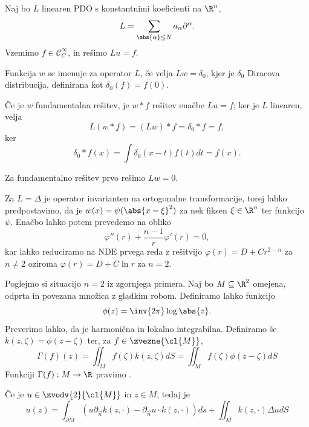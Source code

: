 
Naj bo $L$ linearen PDO s konstantnimi koeficienti na $\R^n$,
\[
  L = \sum_{\abs{\alpha} \le N} a_{\alpha} \partial^\alpha.
\]
Vzemimo $f \in \mathcal{C}^\infty_C$, in rešimo $L u = f$.

\begin{definicija}
  Funkcija $w$ se imenuje  za operator $L$, če
  velja $Lw = \delta_0$, kjer je $\delta_0$ Diracova distribucija, definirana
  kot $\delta_0(f) = f(0)$.
\end{definicija}

Če je $w$ fundamentalna rešitev, je $w * f$ rešitev enačbe $Lu = f$; ker je $L$
linearen, velja
\[
  L(w * f) = (Lw)*f = \delta_0 * f = f,
\]
ker
\[
  \delta_0 * f(x) = \int \delta_0(x-t) f(t) dt = f(x).
\]


Za fundamentalno rešitev prvo rešimo $Lw = 0$.

\begin{primer}
  Za $L = \Delta$ je operator invarianten na ortogonalne transformacije, torej
  lahko predpostavimo, da je $w(x) = \psi(\abs{x-\xi}^2)$ za nek fiksen $\xi \in
  \R^n$ ter funkcijo $\psi$.
  Enačbo lahko potem prevedemo na obliko
  \[
	\varphi''(r) + \frac{n-1}{r} \varphi'(r) = 0,
  \]
  kar lahko reduciramo na NDE prvega reda z rešitvijo $\varphi(r) = D + C r^{2 -
  n}$ za $n \ne 2$ oziroma $\varphi(r) = D + C \ln r$ za $n = 2$.
\end{primer}

Poglejmo si situacijo $n=2$ iz zgornjega primera.
Naj bo $M \subseteq \R^2$ omejena, odprta in povezana množica z gladkim robom.
Definiramo lahko funkcijo
\[
  \phi(z) = \inv{2 \pi} \log \abs{z}.
\]
Preverimo lahko, da je harmonična in lokalno integrabilna.
Definiramo še $k(z, \zeta) = \phi(z-\zeta)$ ter, za $f \in \zvezne{\cl{M}}$,
\[
  \Gamma(f)(z) = \iint_M f(\zeta) k(z, \zeta) dS
  = \iint_M f(\zeta) \phi(z-\zeta) dS
\]
Funkciji $\Gamma(f): M \to \R$ pravimo .

\begin{izrek}
  Če je $u \in \zvodv{2}{\cl{M}}$ in $z \in M$, tedaj je
  \[
	u(z) = \int_{\partial M} \left( u \partial_{\vec{n}} k(z, \cdot) -
	  \partial_{\vec{n}} u \cdot k(z, \cdot) \right) ds
	+ \iint_M k(z, \cdot) \Delta u dS
  \]
\end{izrek}

